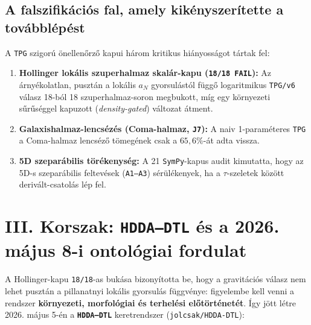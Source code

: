 \documentclass[11pt,a4paper]{article}
\begin{document}
\subsection{A falszifikációs fal, amely kikényszerítette a továbblépést}
A \texttt{TPG} szigorú önellen\H{o}rz\H{o} kapui három kritikus hiányosságot tártak fel:
\begin{enumerate}[leftmargin=1.5em]
\item \textbf{Hollinger lokális szuperhalmaz skalár-kapu (\texttt{18/18 FAIL}):} Az árnyékolatlan, pusztán a lokális $a_N$ gyorsulástól függ\H{o} logaritmikus \texttt{TPG/v6} válasz 18-ból 18 szuperhalmaz-soron megbukott, míg egy környezeti s\H{u}r\H{u}séggel kapuzott (\emph{density-gated}) változat átment.
\item \textbf{Galaxishalmaz-lencsézés (Coma-halmaz, \texttt{J7}):} A naiv 1-paraméteres \texttt{TPG} a Coma-halmaz lencséz\H{o} tömegének csak a $65{,}6\%$-át adta vissza.
\item \textbf{5D szeparábilis törékenység:} A 21 \texttt{SymPy}-kapus audit kimutatta, hogy az 5D-s szeparábilis feltevések (\texttt{A1--A3}) sérülékenyek, ha a $\tau$-szeletek között derivált-csatolás lép fel.
\end{enumerate}

\section{III. Korszak: \texttt{HDDA--DTL} és a 2026. május 8-i ontológiai fordulat}

A Hollinger-kapu \texttt{18/18}-as bukása bizonyította be, hogy a gravitációs válasz nem lehet pusztán a pillanatnyi lokális gyorsulás függvénye: figyelembe kell venni a rendszer \textbf{környezeti, morfológiai és terhelési el\H{o}történetét}. Így jött létre 2026. május 5-én a \textbf{\texttt{HDDA--DTL}} keretrendszer (\texttt{jolcsak/HDDA-DTL}):
\end{document}
